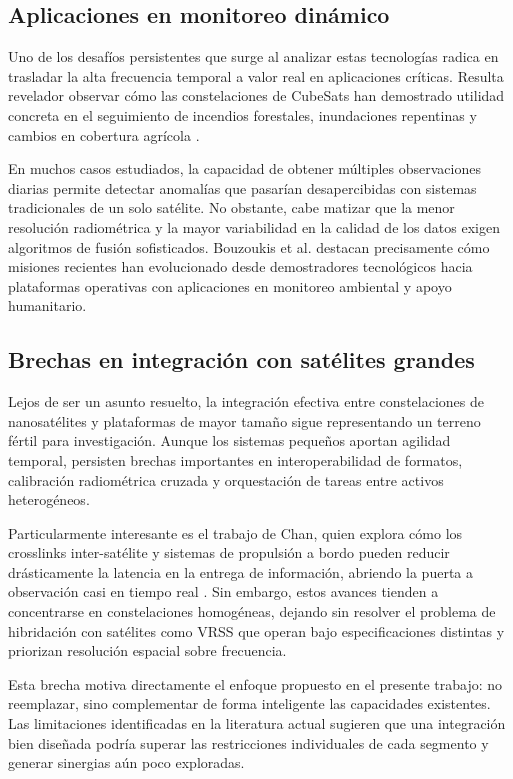 \subsection{Aplicaciones en monitoreo dinámico}

Uno de los desafíos persistentes que surge al analizar estas tecnologías radica en trasladar la alta frecuencia temporal a valor real en aplicaciones críticas. Resulta revelador observar cómo las constelaciones de CubeSats han demostrado utilidad concreta en el seguimiento de incendios forestales, inundaciones repentinas y cambios en cobertura agrícola \cite{Bouzoukis2025}. 

En muchos casos estudiados, la capacidad de obtener múltiples observaciones diarias permite detectar anomalías que pasarían desapercibidas con sistemas tradicionales de un solo satélite. No obstante, cabe matizar que la menor resolución radiométrica y la mayor variabilidad en la calidad de los datos exigen algoritmos de fusión sofisticados. Bouzoukis et al. destacan precisamente cómo misiones recientes han evolucionado desde demostradores tecnológicos hacia plataformas operativas con aplicaciones en monitoreo ambiental y apoyo humanitario.

\subsection{Brechas en integración con satélites grandes}

Lejos de ser un asunto resuelto, la integración efectiva entre constelaciones de nanosatélites y plataformas de mayor tamaño sigue representando un terreno fértil para investigación. Aunque los sistemas pequeños aportan agilidad temporal, persisten brechas importantes en interoperabilidad de formatos, calibración radiométrica cruzada y orquestación de tareas entre activos heterogéneos.

Particularmente interesante es el trabajo de Chan, quien explora cómo los crosslinks inter-satélite y sistemas de propulsión a bordo pueden reducir drásticamente la latencia en la entrega de información, abriendo la puerta a observación casi en tiempo real \cite{Chan2024}. Sin embargo, estos avances tienden a concentrarse en constelaciones homogéneas, dejando sin resolver el problema de hibridación con satélites como VRSS que operan bajo especificaciones distintas y priorizan resolución espacial sobre frecuencia.

Esta brecha motiva directamente el enfoque propuesto en el presente trabajo: no reemplazar, sino complementar de forma inteligente las capacidades existentes. Las limitaciones identificadas en la literatura actual sugieren que una integración bien diseñada podría superar las restricciones individuales de cada segmento y generar sinergias aún poco exploradas.